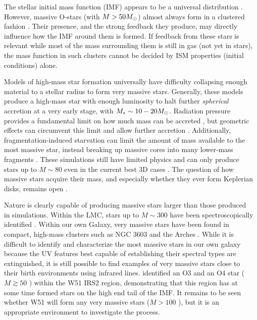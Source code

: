 \documentclass{emulateapj}
\begin{document}
The stellar initial mass function (IMF) appears to be a universal distribution
\citep{Bastian2010a}.  However, massive  O-stars (with $M>50 M_{\odot}$)
almost always form in a clustered fashion \citep[in proto-clusters or
proto-associations;][]{de-Wit2004a,de-Wit2005a,Parker2007a}. %
Their presence, and the strong feedback they produce, may directly influence
how the IMF around them is formed.  If feedback from these stars is relevant
while most of the  mass surrounding them is still in gas (not yet in stars),
the mass function in such clusters cannot be decided by ISM properties
(initial conditions) alone. 

Models of high-mass star formation universally have difficulty collapsing enough
material to a stellar radius to form very massive stars.  Generally, these models
produce a high-mass star with enough luminosity to halt further
\emph{spherical} accretion at a very early stage, with $M_* \sim 10-20M_{\odot}$.
Radiation pressure provides a fundamental limit on how much mass can be
accreted \citep{Wolfire1987a,Osorio1999a}, but geometric effects can circumvent
this limit and allow further accretion
\citep{Yorke2002a,Krumholz2005b,Krumholz2009a,Krumholz2009b,Kuiper2012a,Kuiper2013c,Rosen2016a}.
Additionally, fragmentation-induced starvation can limit the amount of mass
available to the most massive star, instead breaking up massive cores into many
lower-mass fragments \citep{Peters2010a}.  These simulations still have limited
physics and can only produce stars up to $M\sim80$ \msun even in the current
best 3D cases  \citep{Kuiper2015a,Kuiper2016a}.  The question of how massive
stars acquire their mass, and especially whether they ever form Keplerian
disks, remains open \citep{Beltran2016b}.

Nature is clearly capable of producing massive stars larger than those produced
in simulations.  Within the LMC, stars up to $M\sim300$ \msun have been
spectroscopically identified \citep{Crowther2016a}.  Within our own Galaxy,
very massive stars have been found in compact, high-mass clusters such as NGC
3603 and the Arches \citep{Crowther2010a}.  While it is difficult to identify
and characterize the most massive stars in our own galaxy because the UV
features best capable of establishing their spectral types are 
extinguished,
it is still possible to find examples of very massive stars close to their
birth environments using infrared lines.  \citet{Barbosa2008a} identified an O3
and an O4 star ($M\gtrsim50$ \msun) within the W51 IRS2 region, demonstrating
that this region has at some time formed stars on the high
end tail of the IMF.  It remains to be seen whether W51 will form any very
massive stars ($M>100$ \msun), but it is  an appropriate environment to
investigate the process.
\end{document}
